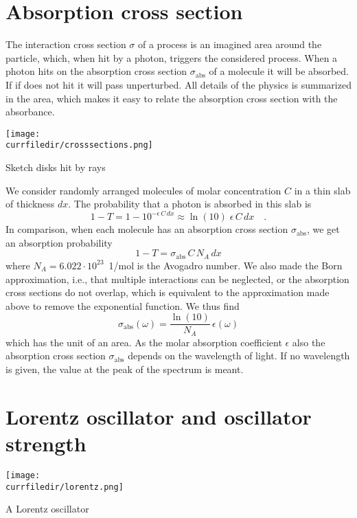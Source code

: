 \section{Absorption cross section}


The interaction cross section $\sigma$ of a process is an imagined area around the particle, which, when hit by a photon, triggers the considered process. When a photon hits on the absorption cross section $\sigma_{\text{abs}}$ of a molecule it will be absorbed. If if does not hit it will pass unperturbed. All details of the physics is summarized in the area, which makes it easy to relate the absorption cross section with the absorbance. 
\begin{marginfigure}
\texttt{[image: \\currfiledir/crosssections.png]}
\caption{Sketch  disks hit by rays}
\end{marginfigure}


We consider randomly arranged molecules of molar concentration $C$ in a thin slab of thickness $dx$. The probability that a photon is absorbed in this slab is
\[
 1 - T =1 -  10^{- \epsilon\, C \, dx} \approx \ln (10) \; \epsilon\, C \, dx \quad .
\]
In comparison, when each molecule has an absorption cross section $\sigma_{\text{abs}}$, we get an absorption probability 
\[
 1 - T = \sigma_{\text{abs}} \, C \, N_A \, dx
\]
where $N_A = 6.022 \cdot 10^{23}$~{1/mol} is the Avogadro number.  We also made the Born approximation, i.e., that multiple interactions can be neglected, or the absorption cross sections do not overlap, which is equivalent to the approximation made above to remove the exponential function.  We thus find
\[
 \sigma_{\text{abs}}(\omega) =  \frac{\ln(10)}{ N_A } \, \epsilon(\omega)
\]
which has the unit of an area. As the  molar absorption coefficient $\epsilon$  also the absorption cross section $\sigma_{\text{abs}}$ depends on the wavelength of light. If no wavelength is given, the value at the peak of the spectrum is meant.


\section{Lorentz oscillator and oscillator strength}


\begin{marginfigure}
\texttt{[image: \\currfiledir/lorentz.png]}
\caption{A Lorentz oscillator}
\end{marginfigure}


